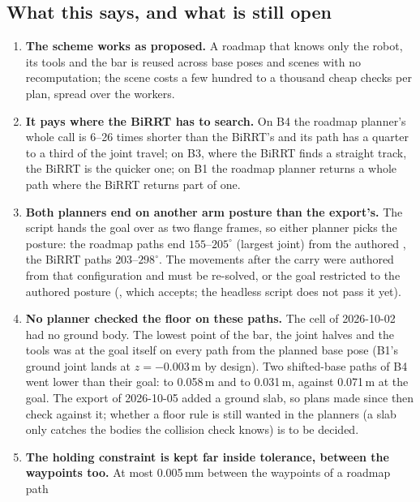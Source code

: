 \subsection{What this says, and what is still open}

\begin{enumerate}[nosep,label=(\roman*)]
  \item \textbf{The scheme works as proposed.} A roadmap that knows only the robot,
        its tools and the bar is reused across base poses and scenes with no
        recomputation; the scene costs a few hundred to a thousand cheap checks per
        plan, spread over the workers.
  \item \textbf{It pays where the BiRRT has to search.} On B4 the roadmap planner's
        whole call is 6--26 times shorter than the BiRRT's and its path has a quarter
        to a third of the joint travel; on B3, where the BiRRT finds a straight
        track, the BiRRT is the quicker one; on B1 the roadmap planner returns a
        whole path where the BiRRT returns part of one.
  \item \textbf{Both planners end on another arm posture than the export's.} The
        script hands the goal over as two flange frames, so either planner picks
        the posture: the roadmap paths end $155$--$205^\circ$ (largest joint) from the
        authored , the BiRRT paths $203$--$298^\circ$. The
        movements after the carry were authored from that configuration and must
        be re-solved, or the goal restricted to the authored posture
        (, which  accepts; the headless script
        does not pass it yet).
  \item \textbf{No planner checked the floor on these paths.} The cell of
        2026-10-02 had no ground body. The lowest point of the bar, the joint
        halves and the tools was at the goal itself on every path from the
        planned base pose (B1's ground joint lands at $z = -0.003$\,m by design).
        Two shifted-base paths of B4 went lower than their goal: to 0.058\,m and to
        0.031\,m, against 0.071\,m at the goal. The export of 2026-10-05 added a
        ground slab, so plans made since then check against it; whether a floor
        rule is still wanted in the planners (a slab only catches the bodies the
        collision check knows) is to be decided.
  \item \textbf{The holding constraint is kept far inside tolerance, between the
        waypoints too.} At most 0.005\,mm between the waypoints of a roadmap path

\end{enumerate}
